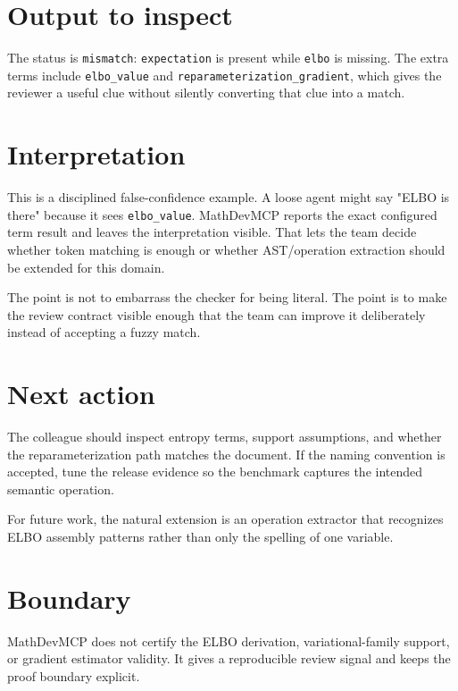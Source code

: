\documentclass[12pt,a4paper,openany]{book}
\begin{document}


\section*{Output to inspect}

The status is \texttt{mismatch}: \texttt{expectation} is present while
\texttt{elbo} is missing. The extra terms include \texttt{elbo\_value} and
\texttt{reparameterization\_gradient}, which gives the reviewer a useful clue
without silently converting that clue into a match.

\section*{Interpretation}

This is a disciplined false-confidence example. A loose agent might say "ELBO is
there" because it sees \texttt{elbo\_value}. MathDevMCP reports the exact configured
term result and leaves the interpretation visible. That lets the team decide
whether token matching is enough or whether AST/operation extraction should be
extended for this domain.

The point is not to embarrass the checker for being literal. The point is to
make the review contract visible enough that the team can improve it deliberately
instead of accepting a fuzzy match.

\section*{Next action}

The colleague should inspect entropy terms, support assumptions, and whether
the reparameterization path matches the document. If the naming convention is
accepted, tune the release evidence so the benchmark captures the intended
semantic operation.

For future work, the natural extension is an operation extractor that recognizes
ELBO assembly patterns rather than only the spelling of one variable.

\section*{Boundary}

MathDevMCP does not certify the ELBO derivation, variational-family support, or
gradient estimator validity. It gives a reproducible review signal and keeps
the proof boundary explicit.
\end{document}

